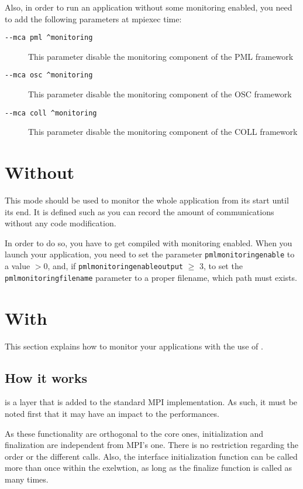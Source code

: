 Also, in order to run an application without some monitoring enabled,
you need to add the following parameters at mpiexec time:
\begin{description}
\item [\texttt{-{}-mca pml \^{}monitoring}] This parameter disable the
  monitoring component of the PML framework
\item [\texttt{-{}-mca osc \^{}monitoring}] This parameter disable the
  monitoring component of the OSC framework
\item [\texttt{-{}-mca coll \^{}monitoring}] This parameter disable
  the monitoring component of the COLL framework
\end{description}

\section{Without \mpit{}}

This mode should be used to monitor the whole application from its
start until its end. It is defined such as you can record the amount
of communications without any code modification.

In order to do so, you have to get \ompi{} compiled with monitoring
enabled. When you launch your application, you need to set the
parameter \texttt{pml\brkunds{}monitoring\brkunds{}enable} to a value
$> 0$, and, if
\texttt{pml\brkunds{}monitoring\brkunds{}enable\brkunds{}output} $\ge$
3, to set the \texttt{pml\brkunds{}monitoring\brkunds{}filename}
parameter to a proper filename, which path must exists.

\section{With \mpit{}}

This section explains how to monitor your applications with the use
of \mpit{}.

\subsection{How it works}

\mpit{} is a layer that is added to the standard MPI
implementation. As such, it must be noted first that it may have an
impact to the performances.

As these functionality are orthogonal to the core ones, \mpit{}
initialization and finalization are independent from MPI's one. There
is no restriction regarding the order or the different calls. Also,
the \mpit{} interface initialization function can be called more than
once within the exelwtion, as long as the finalize function is called
as many times.

